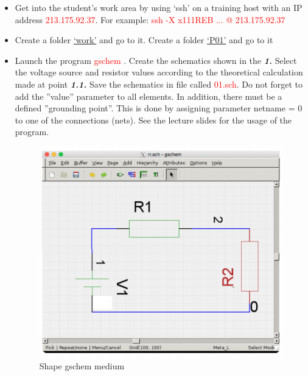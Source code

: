 \documentclass{report}
\begin{document}
\begin{itemize}
  \item Get into the student’s work area by using ‘ssh’ on a training host with an IP address
\textcolor{red}{213.175.92.37}. For example: \textcolor{red}{ssh -X x111REB ... @ 213.175.92.37}
  \item Create a folder \underline{‘work’} and go to it. Create a folder \underline{‘P01’} and go to it
  
  \item Launch the program \textcolor{red}{gschem} . Create the schematics shown in the \textbf{\textit{1. }}Select the voltage
source and resistor values according to the theoretical calculation made at point \textbf{\textit{1.1.}}
Save the schematics in file called \textcolor{red}{01.sch}. Do not forget to add the ”value” parameter
to all elements. In addition, there must be a defined ”grounding point”. This is done by
assigning parameter netname = 0 to one of the connections (nets). See the lecture slides
for the usage of the program. \cite{sharelatex}

\begin{figure}[ht]
\includegraphics{Figures/one}
\caption{Shape gschem medium}
\label{fig:figure1}
\end{figure}



\end{itemize}
\end{document}
